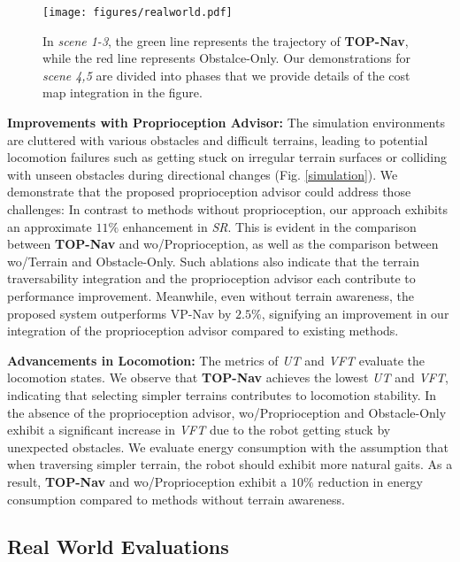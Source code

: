 \documentclass[conference]{IEEEtran}
\begin{document}
\begin{figure}[htbp]
\centerline{\texttt{[image: figures/realworld.pdf]}}
\caption{ { In \textit{scene 1-3}, the green line represents the trajectory of \textbf{TOP-Nav}, while the red line represents Obstalce-Only. Our demonstrations for \textit{scene 4,5} are divided into phases that we provide details of the cost map integration in the figure.}}
\label{realworld}
\end{figure}

\setParDis
\noindent\textbf{Improvements with Proprioception Advisor:}
The simulation environments are cluttered with various obstacles and difficult terrains, leading to potential locomotion failures such as getting stuck on irregular terrain surfaces or colliding with unseen obstacles during directional changes (Fig. \ref{simulation}). We demonstrate that the proposed proprioception advisor could address those challenges: In contrast to methods without proprioception, our approach exhibits an approximate $11\%$ enhancement in \textit{SR}. This is evident in the comparison between \textbf{TOP-Nav} and wo/Proprioception, as well as the comparison between wo/Terrain and Obstacle-Only. Such ablations also indicate that the terrain traversability integration and the proprioception advisor each contribute to performance improvement. Meanwhile, even without terrain awareness, the proposed system outperforms VP-Nav by $2.5\%$, signifying an improvement in our integration of the proprioception advisor compared to existing methods.
 
\setParDis
\noindent\textbf{Advancements in Locomotion:}
The metrics of \textit{UT} and \textit{VFT} evaluate the locomotion states. We observe that \textbf{TOP-Nav} achieves the lowest \textit{UT} and \textit{VFT}, indicating that selecting simpler terrains contributes to locomotion stability. In the absence of the proprioception advisor, wo/Proprioception and Obstacle-Only exhibit a significant increase in \textit{VFT} due to the robot getting stuck by unexpected obstacles. We evaluate energy consumption with the assumption that when traversing simpler terrain, the robot should exhibit more natural gaits. As a result, \textbf{TOP-Nav} and wo/Proprioception exhibit a $10\%$ reduction in energy consumption compared to methods without terrain awareness.

\subsection{Real World Evaluations}
\end{document}
